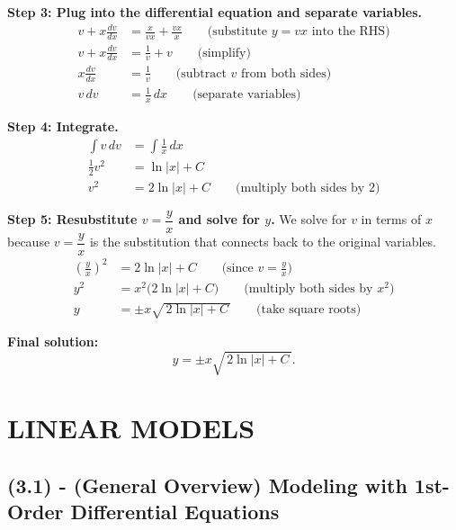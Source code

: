 \documentclass[11pt]{article}
\begin{document}
\medskip
\noindent\textbf{Step 3: Plug into the differential equation and separate variables.}
\begin{align*}
v + x\frac{dv}{dx} &= \frac{x}{vx} + \frac{vx}{x}
\qquad\text{(substitute $y=vx$ into the RHS)}\\
v + x\frac{dv}{dx} &= \frac{1}{v} + v \qquad\text{(simplify)}\\
x\frac{dv}{dx} &= \frac{1}{v} \qquad\text{(subtract $v$ from both sides)}\\
v\,dv &= \frac{1}{x}\,dx \qquad\text{(separate variables)}
\end{align*}

\medskip
\noindent\textbf{Step 4: Integrate.}
\begin{align*}
\int v\,dv &= \int \frac{1}{x}\,dx \\
\frac{1}{2}v^{2} &= \ln|x| + C \\
v^{2} &= 2\ln|x| + C \qquad\text{(multiply both sides by $2$)}
\end{align*}

\medskip
\noindent\textbf{Step 5: Resubstitute $v=\dfrac{y}{x}$ and solve for $y$.}
\noindent We solve for $v$ in terms of $x$ because $v=\dfrac{y}{x}$ is the substitution that connects back to the original variables.
\begin{align*}
\left(\frac{y}{x}\right)^{2} &= 2\ln|x| + C \qquad\text{(since $v=\frac{y}{x}$)}\\
y^{2} &= x^{2}\big(2\ln|x| + C\big) \qquad\text{(multiply both sides by $x^{2}$)}\\
y &= \pm x\sqrt{\,2\ln|x| + C\,} \qquad\text{(take square roots)}
\end{align*}

\noindent\textbf{Final solution:}
\[
\boxed{\;y = \pm x\sqrt{\,2\ln|x| + C\,}.\;}
\]



\section{LINEAR MODELS}
\subsection{(3.1) - (General Overview) Modeling with 1st-Order Differential Equations}
\end{document}
